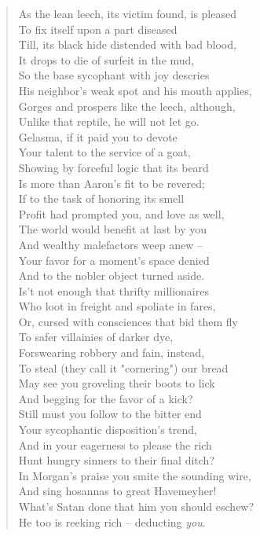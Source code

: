 \documentclass[11pt]{article}
\begin{document}
\begin{quote}   As the lean leech, its victim found, is pleased \\
  To fix itself upon a part diseased \\
  Till, its black hide distended with bad blood, \\
  It drops to die of surfeit in the mud, \\
  So the base sycophant with joy descries \\
  His neighbor's weak spot and his mouth applies, \\
  Gorges and prospers like the leech, although, \\
  Unlike that reptile, he will not let go. \\
  Gelasma, if it paid you to devote \\
  Your talent to the service of a goat, \\
  Showing by forceful logic that its beard \\
  Is more than Aaron's fit to be revered; \\
  If to the task of honoring its smell \\
  Profit had prompted you, and love as well, \\
  The world would benefit at last by you \\
  And wealthy malefactors weep anew -- \\
  Your favor for a moment's space denied \\
  And to the nobler object turned aside. \\
  Is't not enough that thrifty millionaires \\
  Who loot in freight and spoliate in fares, \\
  Or, cursed with consciences that bid them fly \\
  To safer villainies of darker dye, \\
  Forswearing robbery and fain, instead, \\
  To steal (they call it "cornering") our bread \\
  May see you groveling their boots to lick \\
  And begging for the favor of a kick? \\
  Still must you follow to the bitter end \\
  Your sycophantic disposition's trend, \\
  And in your eagerness to please the rich \\
  Hunt hungry sinners to their final ditch? \\
  In Morgan's praise you smite the sounding wire, \\
  And sing hosannas to great Havemeyher! \\
  What's Satan done that him you should eschew? \\
  He too is reeking rich -- deducting {\em you}.  \end{quote}
\end{document}
